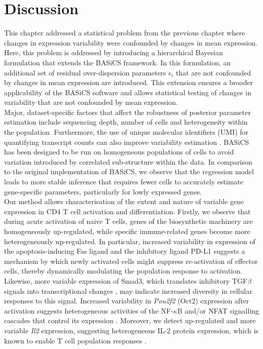 
\section{Discussion}

This chapter addressed a statistical problem from the previous chapter where changes in expression variability were confounded by changes in mean expression. Here, this problem is addressed by introducing a hierarchical Bayesian formulation that extends the BASiCS framework. In this formulation, an additional set of residual over-dispersion parameters $\epsilon_i$ that are not confounded by changes in mean expression are introduced. This extension ensures a broader applicability of the BASiCS software and allows statistical testing of changes in variability that are not confounded by mean expression.  \\ 

Major, dataset-specific factors that affect the robustness of posterior parameter estimation include sequencing depth, number of cells and heterogeneity within the population. Furthermore, the use of unique molecular identifiers (UMI) for quantifying transcript counts can also improve variability estimation \citep{Grun2014}. BASiCS has been designed to be run on homogeneous populations of cells to avoid variation introduced by correlated sub-structure within the data. In comparison to the original implementation of BASiCS, we observe that the regression model leads to more stable inference that requires fewer cells to accurately estimate gene-specific parameters, particularly for lowly expressed genes. \\

Our method allows characterisation of the extent and nature of variable gene expression in CD4\plus{} T cell activation and differentiation. Firstly, we observe that during acute activation of naive T cells, genes of the biosynthetic machinery are homogeneously up-regulated, while specific immune-related genes become more heterogeneously up-regulated. In particular, increased variability in expression of the apoptosis-inducing Fas ligand \citep{Strasser2009} and the inhibitory ligand PD-L1 \citep{Chikuma2016} suggests a mechanism by which newly activated cells might suppress re-activation of effector cells, thereby dynamically modulating the population response to activation. Likewise, more variable expression of Smad3, which translates inhibitory TGF$\beta$ signals into transcriptional changes \citep{Delisle2013}, may indicate increased diversity in cellular responses to this signal. Increased variability in \textit{Pou2f2} (Oct2) expression after activation suggests heterogeneous activities of the NF-$\kappa$B and/or NFAT signalling cascades that control its expression \citep{Mueller2013}.
Moreover, we detect up-regulated and more variable \textit{Il2} expression, suggesting heterogeneous IL-2 protein expression, which is known to enable T cell population responses \citep{Fuhrmann2016}. 

